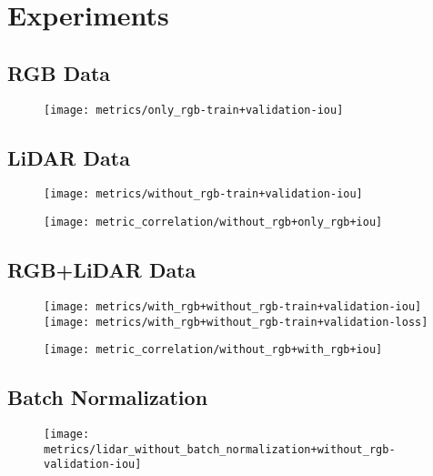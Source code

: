 \section{Experiments}%
\label{sec:experiments}

\subsection{RGB Data}%
\label{sec:rgb-experiment}

\begin{figure}[H]
  \centering
  \texttt{[image: metrics/only\_rgb-train+validation-iou]}
\end{figure}

\subsection{LiDAR Data}

\begin{figure}[H]
  \centering
  \texttt{[image: metrics/without\_rgb-train+validation-iou]}
\end{figure}

\begin{figure}[H]
  \centering
  \texttt{[image: metric\_correlation/without\_rgb+only\_rgb+iou]}
\end{figure}

\subsection{RGB+LiDAR Data}

\begin{figure}[H]
  \centering
  \texttt{[image: metrics/with\_rgb+without\_rgb-train+validation-iou]}
  \texttt{[image: metrics/with\_rgb+without\_rgb-train+validation-loss]}
\end{figure}

\begin{figure}[H]
  \centering
  \texttt{[image: metric\_correlation/without\_rgb+with\_rgb+iou]}
\end{figure}

\subsection{Batch Normalization}

\begin{figure}[H]
  \centering
  \texttt{[image: metrics/lidar\_without\_batch\_normalization+without\_rgb-validation-iou]}
\end{figure}

